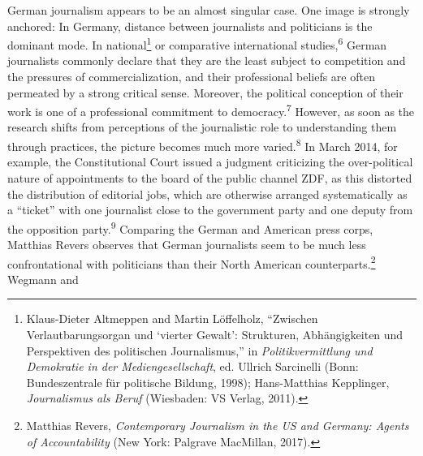 \documentclass{tufte-handout}
\begin{document}
German journalism appears to be an almost singular case. One image is
strongly anchored: In Germany, distance between journalists and
politicians is the dominant mode. In national\footnote{Klaus-Dieter
  Altmeppen and Martin Löffelholz, ``Zwischen Verlautbarungsorgan und
  `vierter Gewalt': Strukturen, Abhängigkeiten und Perspektiven des
  politischen Journalismus,'' in \emph{Politikvermittlung und Demokratie
  in der Mediengesellschaft}, ed. Ullrich Sarcinelli (Bonn:
  Bundeszentrale für politische Bildung, 1998); Hans-Matthias
  Kepplinger, \emph{Journalismus als Beruf} (Wiesbaden: VS Verlag,
  2011).} or comparative international studies,\textsuperscript{6} German journalists
commonly declare that they are the least subject to competition and the
pressures of commercialization, and their professional beliefs are often
permeated by a strong critical sense. Moreover, the political conception
of their work is one of a professional commitment to
democracy.\textsuperscript{7} However, as soon as the research shifts from
perceptions of the journalistic role to understanding them through
practices, the picture becomes much more varied.\textsuperscript{8} In March 2014, for example, the
Constitutional Court issued a judgment criticizing the over-political
nature of appointments to the board of the public channel ZDF, as this
distorted the distribution of editorial jobs, which are otherwise
arranged systematically as a ``ticket'' with one journalist close to the
government party and one deputy from the opposition party.\textsuperscript{9}
Comparing the German and American press corps, Matthias Revers observes
that German journalists seem to be much less confrontational with
politicians than their North American counterparts.\footnote{Matthias
  Revers, \emph{Contemporary Journalism in the US and Germany: Agents of
  Accountability} (New York: Palgrave MacMillan, 2017).} Wegmann and
\end{document}
